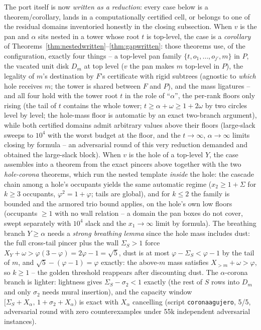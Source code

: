 \documentclass[11pt]{article}
\theoremstyle{definition}
\begin{document}
The port itself is now \emph{written as a reduction}: every case
below is a theorem/corollary, lands in a computationally
certified cell, or belongs to one of the residual domains
inventoried honestly in the closing subsection. When $v$ is the
pan and
$\alpha$ sits nested in a tower whose root $t$ is top-level, the
case is a \emph{corollary} of
Theorems~\ref{thm:nestedwritten}--\ref{thm:gapwritten}: those
theorems use, of the configuration, exactly four things -- a top-level
pan family $\{t,o_1,\dots,o_{j'},m\}$ in $P$, the vacated unit disk
$D_m$ at top level ($v$ the pan makes $m$ top-level in $P$), the
legality of $m$'s destination by $F$'s certificate with rigid
subtrees (agnostic to \emph{which} hole receives $m$; the tower is
shared between $F$ and $P$), and the mass ligatures -- and all four
hold with the tower root $t$ in the role of ``$\alpha$'', the
per-rank floors only rising (the tail of $t$ contains the whole
tower; $t\ge\alpha+\omega\ge1+2\omega$ by two circles level by
level; the hole-mass floor is automatic by an exact two-branch
argument), while both certified domains admit arbitrary values above
their floors (large-slack sweeps to $10^4$ with the worst budget at
the floor, and the $t\to\infty$, $\alpha\to\infty$ limits closing by
formula -- an adversarial round of this very reduction demanded and
obtained the large-slack block). When $v$ is the hole of a top-level
$Y$, the case assembles into a theorem from the exact pincers above
together with the two \emph{hole-corona} theorems, which run the
nested template \emph{inside} the hole: the cascade chain among a
hole's occupants yields the same automatic regime ($x_2\ge1+\Sigma$
for $k\ge3$ occupants, $\varphi^2=1+\varphi$; tails are global), and
for $k\le2$ the family is bounded and the armored trio bound
applies, on the hole's own low floors (occupants $\ge1$ with no wall
relation -- a domain the pan boxes do not cover, swept separately
with $10^4$ slack and the $x_1\to\infty$ limit by formula). The
breathing branch $Y\ge\alpha$ needs a \emph{strong breathing lemma}
since the hole mass includes dust: the full cross-tail pincer plus
the wall $\Sigma_S>1$ force $X_Y+\omega>\varphi(3-\varphi)
=2\varphi-1=\sqrt5$, dust is at most $\varphi-\Sigma_S<\varphi-1$ by
the tail of $m$, and $\sqrt5-(\varphi-1)=\varphi$ exactly: the
above-$m$ mass satisfies $X_{>m}+\omega>\varphi$, so $k\ge1$ -- the
golden threshold reappears after discounting dust. The
$\alpha$-corona branch is lighter: lightness gives
$\Sigma_S-\sigma_2<1$ exactly (the rest of $S$ rows into $D_m$ and
only $\sigma_2$ needs mural insertion), and the capacity window
$[\Sigma_S+X_\alpha,\,1+\sigma_2+X_\alpha)$ is exact with $X_\alpha$
cancelling (script \texttt{coronaagujero}, 5/5, adversarial round
with zero counterexamples under 55k independent adversarial
instances).
\end{document}
